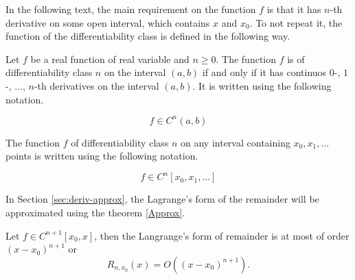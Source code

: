 In the following text, the main requirement on the function \(f\) is that it has \(n\)-th derivative on some open interval, which contains \(x\) and \(x_0\).
To not repeat it, the function of the differentiability class is defined in the following way.

\begin{definition}
 Let \(f\) be a real function of real variable and \(n \ge 0\).
 The function \(f\) is of differentiability class \(n\) on the interval \((a, b)\) if and only if it has continuos \(0\)-, \(1\)-, \(\dots\), \(n\)-th derivatives on the interval \((a, b)\).
 It is written using the following notation.

 \begin{equation}
 f \in C^n(a, b)
 \end{equation}

 The function \(f\) of differentiability class \(n\) on any interval containing \(x_0, x_1, \dots\) points is written using the following notation.

 \begin{equation}
 f \in C^n[x_0, x_1, \dots]
 \end{equation}
\end{definition}

In Section \ref{sec:deriv-approx}, the Lagrange's form of the remainder will be approximated using the theorem \ref{Approx}.

\begin{theorem} \label{Approx}
 Let \(f \in C^{n+1}[x_0, x]\), then the Langrange's form of remainder is at most of order \((x - x_0)^{n+1}\) or
 \begin{equation}
 R_{n, x_0}(x) = O((x - x_0) ^{ n + 1 }).
 \end{equation}
\end{theorem}

